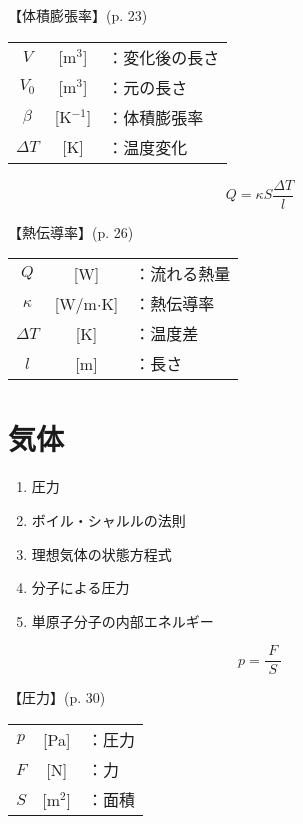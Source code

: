 \documentclass[10pt]{jarticle}
\begin{document}
\vskip3mm
【体積膨張率】{\footnotesize (p. 23)}

\begin{tabular}{ccl}
$V$	&[m$^3$]	&：変化後の長さ\\
$V_0$	&[m$^3$]	&：元の長さ\\
$\beta$	&[K$^{-1}$]	&：体積膨張率\\
$\mathit{\Delta} T$	& [K]	&：温度変化
\end{tabular}




\newpage
\[
	Q = \kappa S \frac{\mathit{\Delta}T}{l}
\]


\vskip3mm
【熱伝導率】{\footnotesize (p. 26)}

\begin{tabular}{ccl}
$Q$	&[W]	&：流れる熱量\\
$\kappa$	&[W/m$\cdot$K]	&：熱伝導率\\
$\mathit{\Delta} T$	& [K]	&：温度差\\
$l$	&[m]	&：長さ
\end{tabular}



\newpage
\addtocounter{page}{-1}
\thispagestyle{empty}
\section{気体}


\begin{enumerate}
\setcounter{enumi}{\thepage}
\small
\itemsep-4mm
\item 圧力\\
\item ボイル・シャルルの法則\\
\item 理想気体の状態方程式\\
\item 分子による圧力\\
\item 単原子分子の内部エネルギー\\
\end{enumerate}






\newpage
\[
	p = \frac{F}{\; S \;}
\]


\vskip3mm
【圧力】{\footnotesize (p. 30)}

\begin{tabular}{ccl}
$p$	&[Pa]	&：圧力\\
$F$	&[N]	&：力\\
$S$	&[m$^2$]	&：面積
\end{tabular}
\end{document}
